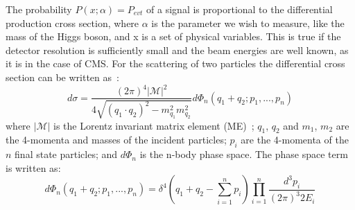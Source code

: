 The probability $P\left(x;\alpha\right)=P_{evt}$ of a signal is proportional to the differential production cross section, where $\alpha$ is the parameter we wish to measure, like the mass of the Higgs boson, and x is a set of physical variables.
This is true if the detector resolution is sufficiently small and the beam energies are well known, as it is in the case of CMS.
For the scattering of two particles the differential cross section can be written as~\cite{Olive:2016xmw}:
\begin{equation}\label{eq:differential_production_cross_section}
d\sigma=\frac{\left(2\pi\right)^{4}|\mathcal{M}|^{2}}{4\sqrt{\left(q_{1}\cdot{q_{2}}\right)^{2}-m_{q_{1}}^{2}m_{q_{2}}^{2}}}d\Phi_{n}\left(q_{1}+q_{2};p_{1},...,p_{n}\right)
\end{equation}
where $|\mathcal{M}|$ is the Lorentz invariant matrix element (ME)~\cite{Griffiths2008}; $q_{1}$, $q_{2}$ and $m_{1}$, $m_{2}$ are the 4-momenta and masses of the incident particles; $p_{i}$ are the 4-momenta of the $n$ final state particles; and $d\Phi_{n}$ is the n-body phase space.
The phase space term is written as:
\begin{equation}
d\Phi_{n}\left(q_{1}+q_{2};p_{1},...,p_{n}\right)=\delta^{4}\left(q_{1}+q_{2}-\sum_{i=1}^{n}p_{i}\right)\prod_{i=1}^{n}\frac{d^{3}p_{i}}{\left(2\pi\right)^{3}2E_{i}}
\end{equation}

